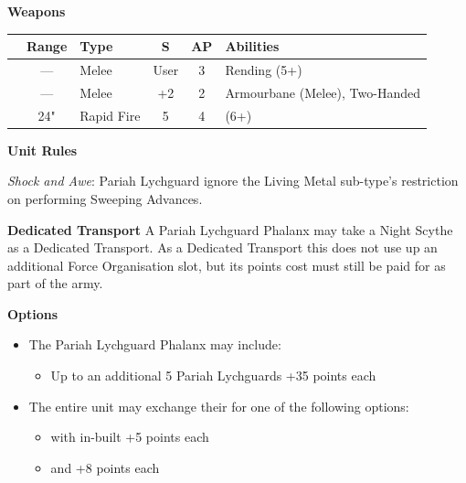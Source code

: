 \begin{minipage}[t]{0.72\textwidth}
	\vspace*{2em}
	\textbf{Weapons}
	
	\begin{tabular}{L{90 pt} c C{40pt} *{2}{c} >{\raggedright\arraybackslash}p{130pt}}
		& Range & Type & S & AP & Abilities \\
		\hline
		 & — & Melee & User & 3 & Rending (5+) \\
		 & — & Melee & +2 & 2 & Armourbane (Melee), Two-Handed \\
		 & 24" & Rapid Fire & 5 & 4 &  (6+) \\
	\end{tabular}
	
	\vspace*{2em}
	\textbf{Unit Rules}
	
	\textit{Shock and Awe}: Pariah Lychguard ignore the Living Metal sub-type's restriction on performing Sweeping Advances.
		
	\vspace*{2em}
	\textbf{Dedicated Transport}
	A Pariah Lychguard Phalanx may take a Night Scythe as a Dedicated Transport. As a Dedicated Transport this does not use up an additional Force Organisation slot, but its points cost must still be paid for as part of the army.
	
	\vspace*{2em}
	\textbf{Options}
	\begin{itemize}
		\item The Pariah Lychguard Phalanx may include:
		\begin{itemize}
			\item Up to an additional 5 Pariah Lychguards \dotfill +35 points each
		\end{itemize}
		\item The entire unit may exchange their  for one of the following options:
		\begin{itemize}
			\item {} with in-built  \dotfill +5 points each
			\item {} and  \dotfill +8 points each
		\end{itemize}
	\end{itemize}
\end{minipage}


\newpage
